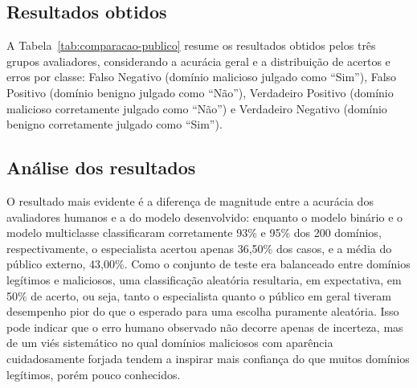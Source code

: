\subsection*{Resultados obtidos}

A Tabela~\ref{tab:comparacao-publico} resume os resultados obtidos pelos três grupos avaliadores, considerando a acurácia geral e a distribuição de acertos e erros por classe: Falso Negativo (domínio malicioso julgado como ``Sim''), Falso Positivo (domínio benigno julgado como ``Não''), Verdadeiro Positivo (domínio malicioso corretamente julgado como ``Não'') e Verdadeiro Negativo (domínio benigno corretamente julgado como ``Sim'').

\begin{table}[h]
\centering
\caption{Comparação de desempenho entre avaliadores humanos e o modelo desenvolvido}
\label{tab:comparacao-publico}
\footnotesize
{}
\end{table}

\subsection*{Análise dos resultados}

O resultado mais evidente é a diferença de magnitude entre a acurácia dos avaliadores humanos e a do modelo desenvolvido: enquanto o modelo binário e o modelo multiclasse classificaram corretamente 93\% e 95\% dos 200 domínios, respectivamente, o especialista acertou apenas 36,50\% dos casos, e a média do público externo, 43,00\%. Como o conjunto de teste era balanceado entre domínios legítimos e maliciosos, uma classificação aleatória resultaria, em expectativa, em 50\% de acerto, ou seja, tanto o especialista quanto o público em geral tiveram desempenho pior do que o esperado para uma escolha puramente aleatória. Isso pode indicar que o erro humano observado não decorre apenas de incerteza, mas de um viés sistemático no qual domínios maliciosos com aparência cuidadosamente forjada tendem a inspirar mais confiança do que muitos domínios legítimos, porém pouco conhecidos.


